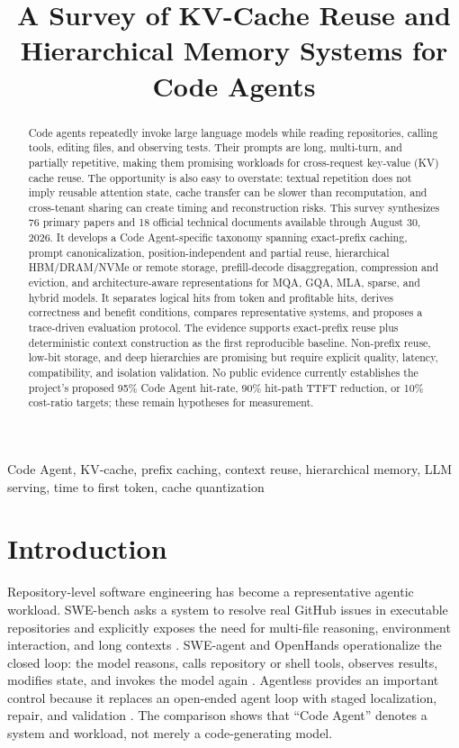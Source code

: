 \documentclass[conference,10pt]{IEEEtran}
\title{A Survey of KV-Cache Reuse and Hierarchical Memory Systems for Code Agents}
\author{\IEEEauthorblockN{Project Research Team}
\IEEEauthorblockA{Independent Technical Survey\\
August 2026}}
\newcommand{\ttft}{TTFT\xspace}
\begin{document}
\maketitle

\begin{abstract}
Code agents repeatedly invoke large language models while reading repositories, calling tools, editing files, and observing tests. Their prompts are long, multi-turn, and partially repetitive, making them promising workloads for cross-request key-value (KV) cache reuse. The opportunity is also easy to overstate: textual repetition does not imply reusable attention state, cache transfer can be slower than recomputation, and cross-tenant sharing can create timing and reconstruction risks. This survey synthesizes 76 primary papers and 18 official technical documents available through August 30, 2026. It develops a Code Agent-specific taxonomy spanning exact-prefix caching, prompt canonicalization, position-independent and partial reuse, hierarchical HBM/DRAM/NVMe or remote storage, prefill-decode disaggregation, compression and eviction, and architecture-aware representations for MQA, GQA, MLA, sparse, and hybrid models. It separates logical hits from token and profitable hits, derives correctness and benefit conditions, compares representative systems, and proposes a trace-driven evaluation protocol. The evidence supports exact-prefix reuse plus deterministic context construction as the first reproducible baseline. Non-prefix reuse, low-bit storage, and deep hierarchies are promising but require explicit quality, latency, compatibility, and isolation validation. No public evidence currently establishes the project's proposed 95\% Code Agent hit-rate, 90\% hit-path \ttft reduction, or 10\% cost-ratio targets; these remain hypotheses for measurement.
\end{abstract}

\begin{IEEEkeywords}
Code Agent, KV-cache, prefix caching, context reuse, hierarchical memory, LLM serving, time to first token, cache quantization
\end{IEEEkeywords}

\section{Introduction}

Repository-level software engineering has become a representative agentic workload. SWE-bench asks a system to resolve real GitHub issues in executable repositories and explicitly exposes the need for multi-file reasoning, environment interaction, and long contexts \cite{jimenez2023swebench}. SWE-agent and OpenHands operationalize the closed loop: the model reasons, calls repository or shell tools, observes results, modifies state, and invokes the model again \cite{yang2024sweagent,wang2024openhands}. Agentless provides an important control because it replaces an open-ended agent loop with staged localization, repair, and validation \cite{xia2024agentless}. The comparison shows that ``Code Agent'' denotes a system and workload, not merely a code-generating model.
\end{document}
